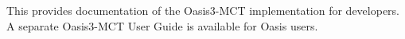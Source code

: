 This provides documentation of the Oasis3-\/\+M\+C\+T implementation for developers. A separate Oasis3-\/\+M\+C\+T User Guide is available for Oasis users. 